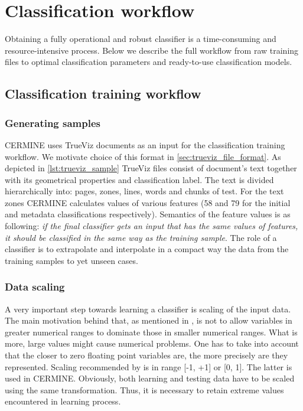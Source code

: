 \chapter{Classification workflow}
Obtaining a fully operational and robust classifier is a time-consuming and resource-intensive process. Below we describe the full workflow from raw training files to optimal classification parameters and ready-to-use classification models.
\section{Classification training workflow}
\subsection{Generating samples}
CERMINE uses TrueViz documents as an input for the classification training workflow. We motivate choice of this format in \ref{sec:trueviz_file_format}. As depicted in \ref{lst:trueviz_sample} TrueViz files consist of document's text together with its geometrical properties and classification label. The text is divided hierarchically into: pages, zones, lines, words and chunks of test. For the text zones CERMINE calculates values of various features (58 and 79 for the initial and metadata classifications respectively). Semantics of the feature values is as following: \textit{if the final classifier gets an input that has the same values of features, it should be classified in the same way as the training sample}. The role of a classifier is to extrapolate and interpolate in a compact way the data from the training samples to yet unseen cases.

\subsection{Data scaling}
A very important step towards learning a classifier is scaling of the input data. The main motivation behind that, as mentioned in \cite{Chih-WeiHsu2010}, is not to allow variables in greater numerical ranges to dominate those in smaller numerical ranges. What is more, large values might cause numerical problems. One has to take into account that the closer to zero floating point variables are, the more precisely are they represented. Scaling recommended by \cite{Chih-WeiHsu2010} is in range [-1, +1] or  [0, 1]. The latter is used in CERMINE. Obviously, both learning and testing data have to be scaled using the same transformation. Thus, it is necessary to retain extreme values encountered in learning process.


